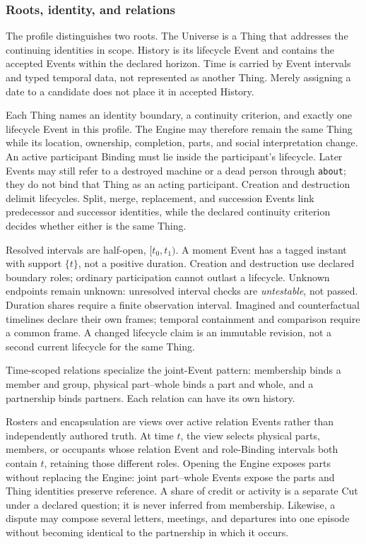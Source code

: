 \documentclass[11pt,a4paper]{article}
\begin{document}
\subsubsection{Roots, identity, and relations}
\label{sec:roots}

The profile distinguishes two roots. The Universe is a Thing that addresses the
continuing identities in scope. History is its lifecycle Event and contains the
accepted Events within the declared horizon. Time is carried by Event intervals
and typed temporal data, not represented as another Thing. Merely assigning a
date to a candidate does not place it in accepted History.

Each Thing names an identity boundary, a continuity criterion, and exactly one
lifecycle Event in this profile. The Engine may therefore remain the same Thing
while its location, ownership, completion, parts, and social interpretation
change. An active participant Binding must lie inside the participant's
lifecycle. Later Events may still refer to a destroyed machine or a dead person
through \texttt{about}; they do not bind that Thing as an acting participant.
Creation and destruction delimit lifecycles. Split, merge, replacement, and
succession Events link predecessor and successor identities, while the declared
continuity criterion decides whether either is the same Thing.

Resolved intervals are half-open, $[t_0,t_1)$. A moment Event has a tagged instant
with support $\{t\}$, not a positive duration. Creation and destruction use
declared boundary roles; ordinary participation cannot outlast a lifecycle.
Unknown endpoints remain unknown: unresolved interval checks are
\emph{untestable}, not passed. Duration shares require a finite observation
interval. Imagined and counterfactual timelines declare their own frames;
temporal containment and comparison require a common frame. A changed lifecycle
claim is an immutable revision, not a second current lifecycle for the same Thing.

Time-scoped relations specialize the joint-Event pattern: membership binds a
member and group, physical part--whole binds a part and whole, and a partnership
binds partners. Each relation can have its own history.

Rosters and encapsulation are views over active relation Events rather than
independently authored truth. At time $t$, the view selects physical parts,
members, or occupants whose relation Event and role-Binding intervals both
contain $t$, retaining those different roles. Opening the Engine exposes parts without replacing
the Engine: joint part--whole Events expose the parts and Thing identities
preserve reference. A share of credit or
activity is a separate Cut under a declared question; it is never inferred from
membership. Likewise, a dispute may compose several letters, meetings, and
departures into one episode without becoming identical to the partnership in
which it occurs.
\end{document}

